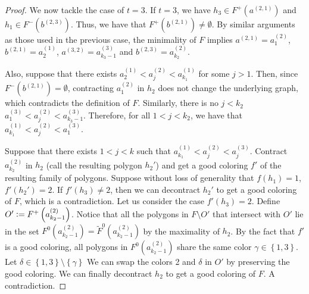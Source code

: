 \documentclass[12pt]{article}
\theoremstyle{definition}
\newcommand{\defeq}{\vcentcolon=}
\begin{document}
\begin{proof}
         We now tackle the case of $t = 3$.
         If $t = 3$, we have $h_3 \in F^{+}
         \left(a^{\left(2, 1\right)}\right)$ 
         and $h_1 \in F^{-}\left(b^{\left(2, 3\right)}\right)$.
         Thus, we have that $F^{+}\left(b^{\left(2, 1\right)}\right)
         \neq \emptyset$.
         By similar arguments as those
         used in the previous case,
         the minimality of $F$ implies
         $a^{\left(2, 1\right)} = a_1^{\left(2\right)}$,
         $b^{\left(2, 1\right)} = a_2^{\left(1\right)}$,
         $a^{\left(3, 2\right)} = a_{k_3 - 1}^{\left(3\right)}$ and
         $b^{\left(2, 3\right)} = a_{k_2}^{\left(2\right)}$.

         Also, suppose that there exists
         $a_2^{\left(1\right)} < a_{j}^{\left(2\right)} <
         a_{k_1}^{\left(1\right)}$ for
         some $j > 1$. Then,
         since $F^{-}\left(b^{\left(2, 1\right)}\right) = \emptyset$, 
         contracting $a_1^{\left(2\right)}$ 
         in $h_2$ does not change the
         underlying graph, which
         contradicts the definition of $F$.
         Similarly, there is no
         $j < k_2$ $a_1^{\left(3\right)} <
         a_{j}^{\left(2\right)} <
         a_{k_3-1}^{\left(3\right)}$.
         Therefore, for all
         $1 < j < k_2$, we have
         that $a_{k_1}^{\left(1\right)} < 
         a_{j}^{\left(2\right)} < 
         a_1^{\left(3\right)}$.

         Suppose that there exists
         $1 < j < k$ such that
         $a_{k_1}^{\left(1\right)} <
         a_{j}^{\left(2\right)} <
         a_{j}^{\left(3\right)}$.
         Contract $a_{k_2}^{\left(2\right)}$ 
         in $h_2$ (call the resulting
         polygon $h_2'$)
         and get a good coloring
         $f'$ of the resulting family
         of polygons.
         Suppose without loss of
         generality that $f\left(h_1\right) = 1$,
         $f'\left(h_2'\right) = 2$.
         If $f'\left(h_3\right) \neq 2$, 
         then we can decontract $h_2'$ 
         to get a good coloring of $F$, 
         which is a contradiction.
         Let us consider the case
         $f'\left(h_3\right) = 2$.
         Define $O' \defeq F^{+}\left(a_{k_2 - 1}^{\left(2\right)}\right)$.
         Notice that all the polygons in
         $F \setminus O'$ that intersect with
         $O'$ lie in the set 
         $F^{0}\left(a_{k_2-1}^{\left(2\right)}\right) =
         \widetilde{F}^{0}\left(a_{k_2-1}^{\left(2\right)}\right)$
         by the maximality of $h_2$.
         By the fact that $f'$ is a
         good coloring, all polygons in $F^{0}\left(
         a_{k_2-1}^{\left(2\right)}\right)$
         share the same color $\gamma \in \left\{1, 3\right\}$.
         Let $\delta \in \left\{1, 3\right\} 
         \setminus \left\{\gamma\right\}$
         We can swap the colors 2 and $\delta$
         in $O'$ by preserving the good coloring.
         We can finally decontract $h_2$ to get
         a good coloring of $F$. 
         A contradiction.


\end{proof}
\end{document}
